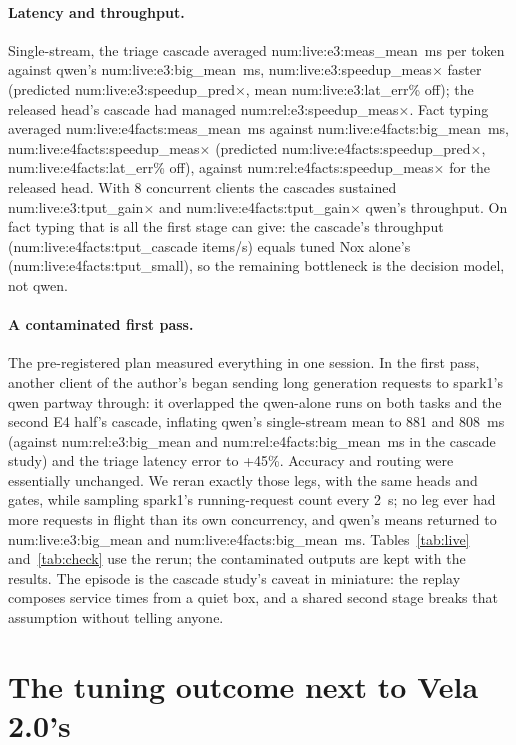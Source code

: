 \documentclass[11pt]{article}
\newcommand{\N}[1]{\csname num:#1\endcsname}
\begin{document}
\paragraph{Latency and throughput.} Single-stream, the triage cascade averaged
\N{live:e3:meas_mean}~ms per token against qwen's \N{live:e3:big_mean}~ms,
\N{live:e3:speedup_meas}$\times$ faster (predicted \N{live:e3:speedup_pred}$\times$, mean
\N{live:e3:lat_err}\% off); the released head's cascade had managed \N{rel:e3:speedup_meas}$\times$.
Fact typing averaged \N{live:e4facts:meas_mean}~ms against \N{live:e4facts:big_mean}~ms,
\N{live:e4facts:speedup_meas}$\times$ (predicted \N{live:e4facts:speedup_pred}$\times$,
\N{live:e4facts:lat_err}\% off), against \N{rel:e4facts:speedup_meas}$\times$ for the released head.
With 8 concurrent clients the cascades sustained \N{live:e3:tput_gain}$\times$ and
\N{live:e4facts:tput_gain}$\times$ qwen's throughput. On fact typing that is all the first stage can
give: the cascade's throughput (\N{live:e4facts:tput_cascade} items/s) equals tuned Nox alone's
(\N{live:e4facts:tput_small}), so the remaining bottleneck is the decision model, not qwen.

\paragraph{A contaminated first pass.} The pre-registered plan measured everything in one session.
In the first pass, another client of the author's began sending long generation requests to spark1's
qwen partway through: it overlapped the qwen-alone runs on both tasks and the second E4 half's
cascade, inflating qwen's single-stream mean to 881 and 808~ms (against
\N{rel:e3:big_mean} and \N{rel:e4facts:big_mean}~ms in the cascade study) and the triage latency
error to +45\%. Accuracy and routing were essentially unchanged. We reran exactly those legs, with the
same heads and gates, while sampling spark1's running-request count every 2~s; no leg ever had more
requests in flight than its own concurrency, and qwen's means returned to \N{live:e3:big_mean} and
\N{live:e4facts:big_mean}~ms. Tables~\ref{tab:live} and~\ref{tab:check} use the rerun; the
contaminated outputs are kept with the results. The episode is the cascade study's caveat in
miniature: the replay composes service times from a quiet box, and a shared second stage breaks that
assumption without telling anyone.

\section{The tuning outcome next to Vela 2.0's}
\label{sec:vela}
\end{document}
